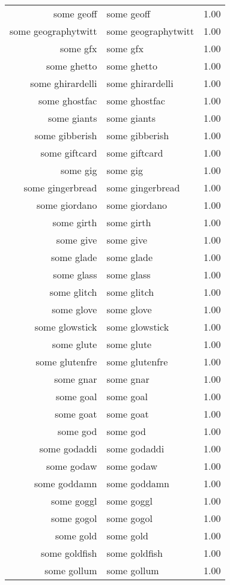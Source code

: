 \begin{table}[ht]
\begin{tabular}{rlr}
  some geoff & some geoff & 1.00 \\ 
  some geographytwitt & some geographytwitt & 1.00 \\ 
  some gfx & some gfx & 1.00 \\ 
  some ghetto & some ghetto & 1.00 \\ 
  some ghirardelli & some ghirardelli & 1.00 \\ 
  some ghostfac & some ghostfac & 1.00 \\ 
  some giants & some giants & 1.00 \\ 
  some gibberish & some gibberish & 1.00 \\ 
  some giftcard & some giftcard & 1.00 \\ 
  some gig & some gig & 1.00 \\ 
  some gingerbread & some gingerbread & 1.00 \\ 
  some giordano & some giordano & 1.00 \\ 
  some girth & some girth & 1.00 \\ 
  some give & some give & 1.00 \\ 
  some glade & some glade & 1.00 \\ 
  some glass & some glass & 1.00 \\ 
  some glitch & some glitch & 1.00 \\ 
  some glove & some glove & 1.00 \\ 
  some glowstick & some glowstick & 1.00 \\ 
  some glute & some glute & 1.00 \\ 
  some glutenfre & some glutenfre & 1.00 \\ 
  some gnar & some gnar & 1.00 \\ 
  some goal & some goal & 1.00 \\ 
  some goat & some goat & 1.00 \\ 
  some god & some god & 1.00 \\ 
  some godaddi & some godaddi & 1.00 \\ 
  some godaw & some godaw & 1.00 \\ 
  some goddamn & some goddamn & 1.00 \\ 
  some goggl & some goggl & 1.00 \\ 
  some gogol & some gogol & 1.00 \\ 
  some gold & some gold & 1.00 \\ 
  some goldfish & some goldfish & 1.00 \\ 
  some gollum & some gollum & 1.00 \\ 

\end{tabular}
\end{table}
